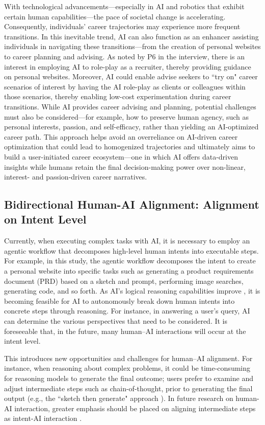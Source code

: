 With technological advancements—especially in AI and robotics that exhibit certain human capabilities—the pace of societal change is accelerating. Consequently, individuals' career trajectories may experience more frequent transitions. In this inevitable trend, AI can also function as an enhancer assisting individuals in navigating these transitions—from the creation of personal websites to career planning and advising. As noted by P6 in the interview, there is an interest in employing AI to role-play as a recruiter, thereby providing guidance on personal websites. Moreover, AI could enable advise seekers to ``try on" career scenarios of interest by having the AI role-play as clients or colleagues within those scenarios, thereby enabling low-cost experimentation during career transitions. While AI provides career advising and planning, potential challenges must also be considered—for example, how to preserve human agency, such as personal interests, passion, and self-efficacy, rather than yielding an AI-optimized career path. This approach helps avoid an overreliance on AI-driven career optimization that could lead to homogenized trajectories and ultimately aims to build a user-initiated career ecosystem—one in which AI offers data-driven insights while humans retain the final decision-making power over non-linear, interest- and passion-driven career narratives.

\subsection{Bidirectional Human-AI Alignment: Alignment on Intent Level}

Currently, when executing complex tasks with AI, it is necessary to employ an agentic workflow that decomposes high-level human intents into executable steps. For example, in this study, the agentic workflow decomposes the intent to create a personal website into specific tasks such as generating a product requirements document (PRD) based on a sketch and prompt, performing image searches, generating code, and so forth. As AI's logical reasoning capabilities improve \cite{guo2025deepseek,openaiOpenAIO3mini2025}, it is becoming feasible for AI to autonomously break down human intents into concrete steps through reasoning. For instance, in answering a user's query, AI can determine the various perspectives that need to be considered. It is foreseeable that, in the future, many human–AI interactions will occur at the intent level.

This introduces new opportunities and challenges for human–AI alignment. For instance, when reasoning about complex problems, it could be time-consuming for reasoning models to generate the final outcome; users prefer to examine and adjust intermediate steps such as chain-of-thought, prior to generating the final output (e.g., the ``sketch then generate" approach \cite{zhu-tianSketchThenGenerate2024}). In future research on human-AI interaction, greater emphasis should be placed on aligning intermediate steps as intent-AI interaction \cite{dingIntentbasedUserInterfaces2024}.

